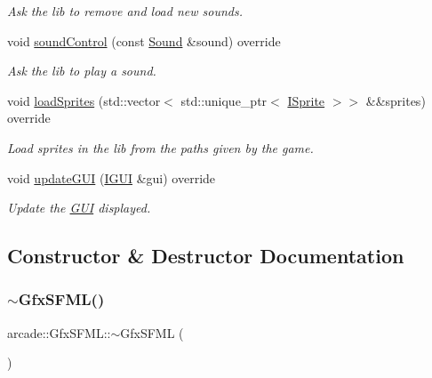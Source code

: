 \begin{DoxyCompactItemize}
\begin{DoxyCompactList}\small\item\em Ask the lib to remove and load new sounds. \end{DoxyCompactList}\item 
void \hyperlink{classarcade_1_1_gfx_s_f_m_l_a785424b9463d487365c781bf91eda6a8}{sound\+Control} (const \hyperlink{structarcade_1_1_sound}{Sound} \&sound) override
\begin{DoxyCompactList}\small\item\em Ask the lib to play a sound. \end{DoxyCompactList}\item 
void \hyperlink{classarcade_1_1_gfx_s_f_m_l_a1e586ce151c47e3b5a6abcfdf5ecdc79}{load\+Sprites} (std\+::vector$<$ std\+::unique\+\_\+ptr$<$ \hyperlink{classarcade_1_1_i_sprite}{I\+Sprite} $>$$>$ \&\&sprites) override
\begin{DoxyCompactList}\small\item\em Load sprites in the lib from the paths given by the game. \end{DoxyCompactList}\item 
void \hyperlink{classarcade_1_1_gfx_s_f_m_l_ad8ba0c70b00c4132010ceabc2246bb59}{update\+G\+UI} (\hyperlink{classarcade_1_1_i_g_u_i}{I\+G\+UI} \&gui) override
\begin{DoxyCompactList}\small\item\em Update the \hyperlink{classarcade_1_1_g_u_i}{G\+UI} displayed. \end{DoxyCompactList}\end{DoxyCompactItemize}


\subsection{Constructor \& Destructor Documentation}
\mbox{\label{classarcade_1_1_gfx_s_f_m_l_a66702cb942c775a31364c12fe5d6e06a}} 
\subsubsection{\texorpdfstring{$\sim$\+Gfx\+S\+F\+M\+L()}{~GfxSFML()}}
{\footnotesize\ttfamily arcade\+::\+Gfx\+S\+F\+M\+L\+::$\sim$\+Gfx\+S\+F\+ML (\begin{DoxyParamCaption}{ }\end{DoxyParamCaption})\hspace{0.3cm}{\ttfamily [virtual]}}

